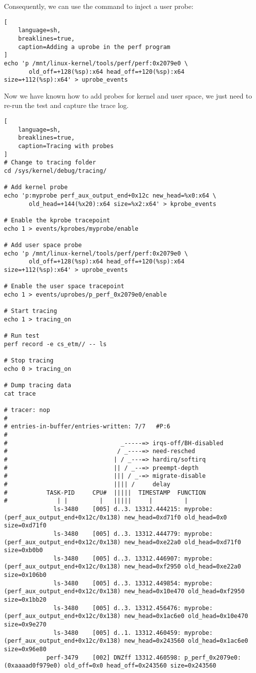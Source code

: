 \documentclass[11pt]{diazessay} %
\begin{document}
Consequently, we can use the command to inject a user probe:

\begin{lstlisting}[
  	language=sh,
	breaklines=true,
	caption=Adding a uprobe in the perf program
]
echo 'p /mnt/linux-kernel/tools/perf/perf:0x2079e0 \
       old_off=+128(%sp):x64 head_off=+120(%sp):x64 size=+112(%sp):x64' > uprobe_events
\end{lstlisting}

Now we have known how to add probes for kernel and user space, we just need to
re-run the test and capture the trace log.

\begin{lstlisting}[
  	language=sh,
	breaklines=true,
	caption=Tracing with probes
]
# Change to tracing folder
cd /sys/kernel/debug/tracing/

# Add kernel probe
echo 'p:myprobe perf_aux_output_end+0x12c new_head=%x0:x64 \
       old_head=+144(%x20):x64 size=%x2:x64' > kprobe_events

# Enable the kprobe tracepoint
echo 1 > events/kprobes/myprobe/enable

# Add user space probe
echo 'p /mnt/linux-kernel/tools/perf/perf:0x2079e0 \
       old_off=+128(%sp):x64 head_off=+120(%sp):x64 size=+112(%sp):x64' > uprobe_events

# Enable the user space tracepoint
echo 1 > events/uprobes/p_perf_0x2079e0/enable

# Start tracing
echo 1 > tracing_on

# Run test
perf record -e cs_etm// -- ls

# Stop tracing
echo 0 > tracing_on

# Dump tracing data
cat trace

# tracer: nop
#
# entries-in-buffer/entries-written: 7/7   #P:6
#
#                                _-----=> irqs-off/BH-disabled
#                               / _----=> need-resched
#                              | / _---=> hardirq/softirq
#                              || / _--=> preempt-depth
#                              ||| / _-=> migrate-disable
#                              |||| /     delay
#           TASK-PID     CPU#  |||||  TIMESTAMP  FUNCTION
#              | |         |   |||||     |         |
              ls-3480    [005] d..3. 13312.444215: myprobe: (perf_aux_output_end+0x12c/0x138) new_head=0xd71f0 old_head=0x0 size=0xd71f0
              ls-3480    [005] d..3. 13312.444779: myprobe: (perf_aux_output_end+0x12c/0x138) new_head=0xe22a0 old_head=0xd71f0 size=0xb0b0
              ls-3480    [005] d..3. 13312.446907: myprobe: (perf_aux_output_end+0x12c/0x138) new_head=0xf2950 old_head=0xe22a0 size=0x106b0
              ls-3480    [005] d..3. 13312.449854: myprobe: (perf_aux_output_end+0x12c/0x138) new_head=0x10e470 old_head=0xf2950 size=0x1bb20
              ls-3480    [005] d..3. 13312.456476: myprobe: (perf_aux_output_end+0x12c/0x138) new_head=0x1ac6e0 old_head=0x10e470 size=0x9e270
              ls-3480    [005] d..1. 13312.460459: myprobe: (perf_aux_output_end+0x12c/0x138) new_head=0x243560 old_head=0x1ac6e0 size=0x96e80
            perf-3479    [002] DNZff 13312.460598: p_perf_0x2079e0: (0xaaaad0f979e0) old_off=0x0 head_off=0x243560 size=0x243560
\end{lstlisting}
\end{document}
